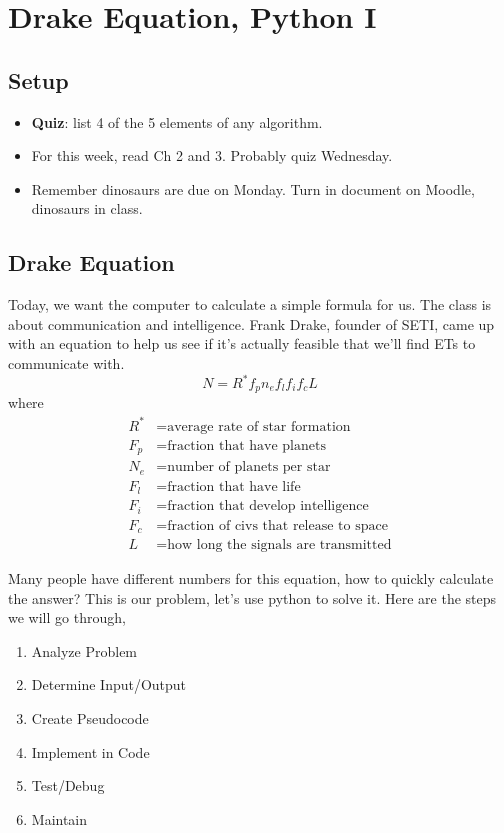 \documentclass{article}
\begin{document}
\newpage

\section{Drake Equation, Python I}

\subsection*{Setup}

\begin{itemize}
\item \textbf{Quiz}: list 4 of the 5 elements of any algorithm.
\item For this week, read Ch 2 and 3. Probably quiz Wednesday.
\item Remember dinosaurs are due on Monday.  Turn in document on
  Moodle, dinosaurs in class.
\end{itemize}

\subsection*{Drake Equation}

Today, we want the computer to calculate a simple formula for us.  The
class is about communication and intelligence.  Frank Drake, founder
of SETI, came up with an equation to help us see if it's actually
feasible that we'll find ETs to communicate with.
\[ N = R^* f_p n_e f_l f_i f_c L \]
where
\begin{align*}
R^* &= \text{average rate of star formation} \\
F_p &= \text{fraction that have planets} \\
N_e &= \text{number of planets per star} \\
F_l &= \text{fraction that have life} \\
F_i &= \text{fraction that develop intelligence} \\
F_c &= \text{fraction of civs that release to space} \\
L &= \text{how long the signals are transmitted}
\end{align*}

Many people have different numbers for this equation, how to quickly
calculate the answer?  This is our problem, let's use python to solve
it.  Here are the steps we will go through,

\begin{enumerate}
\item Analyze Problem
\item Determine Input/Output
\item Create Pseudocode
\item Implement in Code
\item Test/Debug
\item Maintain
\end{enumerate}
\end{document}
